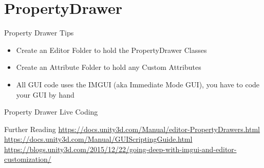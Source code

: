 \part{PropertyDrawer}
\frame{\partpage}

\begin{frame}{Property Drawer Tips}
	\begin{itemize}
		\item Create an Editor Folder to hold the PropertyDrawer Classes
		\item Create an Attribute Folder to hold any Custom Attributes
		\item All GUI code uses the IMGUI (aka Immediate Mode GUI), you have to code your GUI by hand
	\end{itemize}
\end{frame}


\begin{frame}
	\begin{center}
		Property Drawer Live Coding
	\end{center}
\end{frame}

\begin{frame}{Further Reading}
	\url{https://docs.unity3d.com/Manual/editor-PropertyDrawers.html}
	\url{https://docs.unity3d.com/Manual/GUIScriptingGuide.html}
	\url{https://blogs.unity3d.com/2015/12/22/going-deep-with-imgui-and-editor-customization/}
\end{frame}